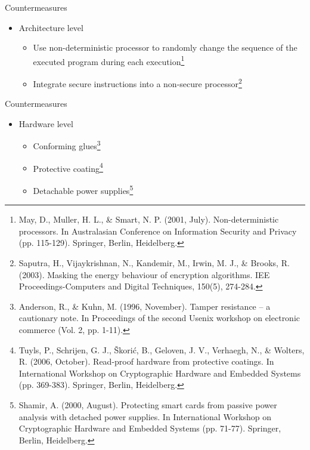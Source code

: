 \begin{frame}{Countermeasures}
    \begin{itemize}
        \item Architecture level
        \begin{itemize}
            \item Use non-deterministic processor to randomly change the sequence of the executed program during each execution\footnote{May, D., Muller, H. L., \& Smart, N. P. (2001, July). Non-deterministic processors. In Australasian Conference on Information Security and Privacy (pp. 115-129). Springer, Berlin, Heidelberg.} 
            \item Integrate secure instructions into a non-secure processor\footnote{Saputra, H., Vijaykrishnan, N., Kandemir, M., Irwin, M. J., \& Brooks, R. (2003). Masking the energy behaviour of encryption algorithms. IEE Proceedings-Computers and Digital Techniques, 150(5), 274-284.}
        \end{itemize}  
    \end{itemize}
\end{frame}

\begin{frame}{Countermeasures}
    \begin{itemize}
        \item Hardware level
        \begin{itemize}
            \item Conforming glues\footnote{Anderson, R., \& Kuhn, M. (1996, November). Tamper resistance -- a cautionary note. In Proceedings of the second Usenix workshop on electronic commerce (Vol. 2, pp. 1-11).}
            \item Protective coating\footnote{Tuyls, P., Schrijen, G. J., Škorić, B., Geloven, J. V., Verhaegh, N., \& Wolters, R. (2006, October). Read-proof hardware from protective coatings. In International Workshop on Cryptographic Hardware and Embedded Systems (pp. 369-383). Springer, Berlin, Heidelberg.}
            \item Detachable power supplies\footnote{Shamir, A. (2000, August). Protecting smart cards from passive power analysis with detached power supplies. In International Workshop on Cryptographic Hardware and Embedded Systems (pp. 71-77). Springer, Berlin, Heidelberg.}
        \end{itemize} 
    \end{itemize}
\end{frame}

